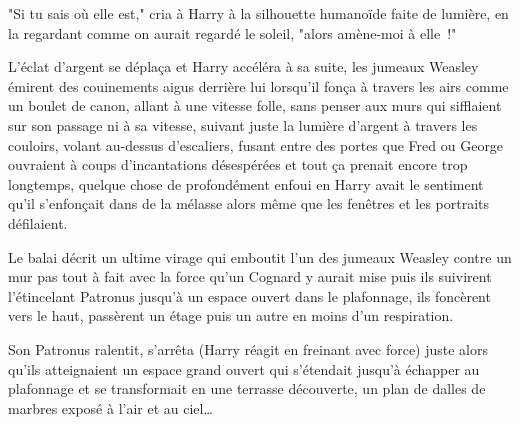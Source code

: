"Si tu sais où elle est," cria à Harry à la silhouette humanoïde faite de lumière, en la regardant comme on aurait regardé le soleil, "alors amène-moi à elle~!"

L'éclat d'argent se déplaça et Harry accéléra à sa suite, les jumeaux Weasley émirent des couinements aigus derrière lui lorsqu'il fonça à travers les airs comme un boulet de canon, allant à une vitesse folle, sans penser aux murs qui sifflaient sur son passage ni à sa vitesse, suivant juste la lumière d'argent à travers les couloirs, volant au-dessus d'escaliers, fusant entre des portes que Fred ou George ouvraient à coups d'incantations désespérées et tout ça prenait encore trop longtemps, quelque chose de profondément enfoui en Harry avait le sentiment qu'il s'enfonçait dans de la mélasse alors même que les fenêtres et les portraits défilaient.

Le balai décrit un ultime virage qui emboutit l'un des jumeaux Weasley contre un mur pas tout à fait avec la force qu'un Cognard y aurait mise puis ils suivirent l'étincelant Patronus jusqu'à un espace ouvert dans le plafonnage, ils foncèrent vers le haut, passèrent un étage puis un autre en moins d'un respiration.

Son Patronus ralentit, s'arrêta (Harry réagit en freinant avec force) juste alors qu'ils atteignaient un espace grand ouvert qui s'étendait jusqu'à échapper au plafonnage et se transformait en une terrasse découverte, un plan de dalles de marbres exposé à l'air et au ciel… 

